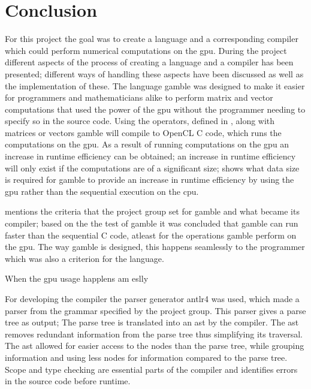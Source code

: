 \chapter{Conclusion} %
\label{cha:conclusion}

For this project the goal was to create a language and a corresponding compiler which could perform numerical computations on the \acrshort{gpu}.
During the project different aspects of the process of creating a language and a compiler has been presented; different ways of handling these aspects have been discussed as well as the implementation of these.
The language \gls{gamble} was designed to make it easier for programmers and mathematicians alike to perform matrix and vector computations that used the power of the \acrshort{gpu} without the programmer needing to specify so in the source code.
Using the operators, defined in , along with matrices or vectors \gls{gamble} will compile to OpenCL C code, which runs the computations on the \acrshort{gpu}.
As a result of running computations on the \acrshort{gpu} an increase in runtime efficiency can be obtained; an increase in runtime efficiency will only exist if the computations are of a significant size;  shows what data size is required for \gls{gamble} to provide an increase in runtime efficiency by using the \acrshort{gpu} rather than the sequential execution on the \acrshort{cpu}.

 mentions the criteria that the project group set for \gls{gamble} and what became its compiler; based on the the test of \gls{gamble} it was concluded that \gls{gamble} can run faster than the sequential C code, atleast for the operations \gls{gamble} perform on the \acrshort{gpu}.
The way \gls{gamble} is designed, this happens seamlessly to the programmer which was also a criterion for the language.

When the \acrshort{gpu} usage happlens am eslly

For developing the compiler the parser generator \acrshort{antlr}4 was used, which made a parser from the grammar specified by the project group.
This parser gives a parse tree as output; The parse tree is translated into an \acrshort{ast} by the compiler.
The \acrshort{ast} removes redundant information from the parse tree thus simplifying its traversal.
The \acrshort{ast} allowed for easier access to the nodes than the parse tree, while grouping information and using less nodes for information compared to the parse tree.
Scope and type checking are essential parts of the compiler and identifies errors in the source code before runtime.


